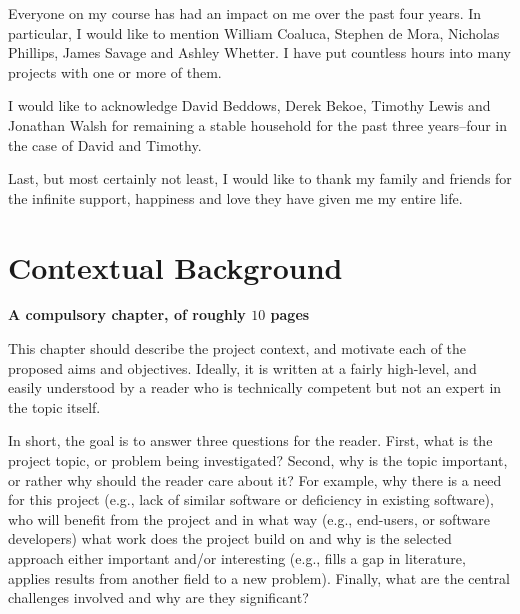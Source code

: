 \documentclass[ %
                    author={Dominic Joseph Moylett},
                    degree={MEng},
                     title={Dictionary Matching with Fingerprints},
                  subtitle={An Empirical Analysis},
                      type={Research},
                      year={2014} ]{dissertation}
\begin{document}
Everyone on my course has had an impact on me over the past four years. In particular, I would like to mention William Coaluca, Stephen de Mora, Nicholas Phillips, James Savage and Ashley Whetter. I have put countless hours into many projects with one or more of them.

I would like to acknowledge David Beddows, Derek Bekoe, Timothy Lewis and Jonathan Walsh for remaining a stable household for the past three years--four in the case of David and Timothy.

Last, but most certainly not least, I would like to thank my family and friends for the infinite support, happiness and love they have given me my entire life.


%

\mainmatter


\chapter{Contextual Background}
\label{chap:context}

{\bf A compulsory chapter, of roughly $10$ pages}
\vspace{1cm} 

\noindent
This chapter should describe the project context, and motivate each of
the proposed aims and objectives.  Ideally, it is written at a fairly 
high-level, and easily understood by a reader who is technically 
competent but not an expert in the topic itself.

In short, the goal is to answer three questions for the reader.  First, 
what is the project topic, or problem being investigated?  Second, why 
is the topic important, or rather why should the reader care about it?  
For example, why there is a need for this project (e.g., lack of similar 
software or deficiency in existing software), who will benefit from the 
project and in what way (e.g., end-users, or software developers) what 
work does the project build on and why is the selected approach either
important and/or interesting (e.g., fills a gap in literature, applies
results from another field to a new problem).  Finally, what are the 
central challenges involved and why are they significant? 
 
\end{document}
